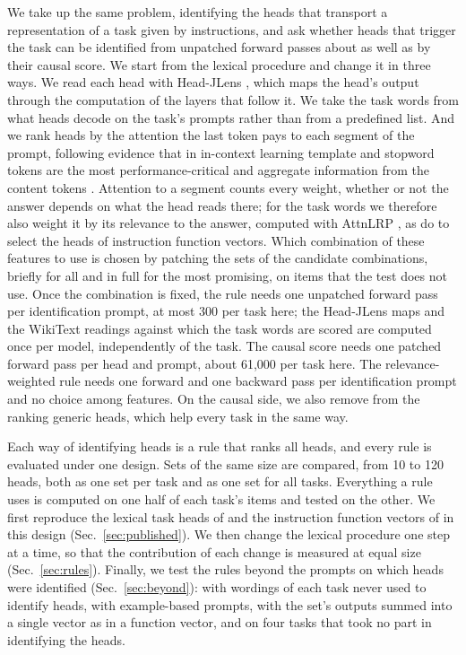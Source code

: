 \documentclass[10pt,a4paper]{article}
\begin{document}
We take up the same problem, identifying the heads that transport a representation of a task given by instructions, and ask whether heads that trigger the task can be identified from unpatched forward passes about as well as by their causal score. We start from the lexical procedure and change it in three ways. We read each head with Head-JLens \citep{merlo2026headjlens}, which maps the head's output through the computation of the layers that follow it. We take the task words from what heads decode on the task's prompts rather than from a predefined list. And we rank heads by the attention the last token pays to each segment of the prompt, following evidence that in in-context learning template and stopword tokens are the most performance-critical and aggregate information from the content tokens \citep{bai2026performance}. Attention to a segment counts every weight, whether or not the answer depends on what the head reads there; for the task words we therefore also weight it by its relevance to the answer, computed with AttnLRP \citep{achtibat2024attnlrp}, as \citet{pham2026fast} do to select the heads of instruction function vectors. Which combination of these features to use is chosen by patching the sets of the candidate combinations, briefly for all and in full for the most promising, on items that the test does not use. Once the combination is fixed, the rule needs one unpatched forward pass per identification prompt, at most 300 per task here; the Head-JLens maps and the WikiText readings against which the task words are scored are computed once per model, independently of the task. The causal score needs one patched forward pass per head and prompt, about 61{,}000 per task here. The relevance-weighted rule needs one forward and one backward pass per identification prompt and no choice among features. On the causal side, we also remove from the ranking generic heads, which help every task in the same way.

Each way of identifying heads is a rule that ranks all heads, and every rule is evaluated under one design. Sets of the same size are compared, from 10 to 120 heads, both as one set per task and as one set for all tasks. Everything a rule uses is computed on one half of each task's items and tested on the other. We first reproduce the lexical task heads of \citet{yang2026shared} and the instruction function vectors of \citet{davidson2025different} in this design (Sec.~\ref{sec:published}). We then change the lexical procedure one step at a time, so that the contribution of each change is measured at equal size (Sec.~\ref{sec:rules}). Finally, we test the rules beyond the prompts on which heads were identified (Sec.~\ref{sec:beyond}): with wordings of each task never used to identify heads, with example-based prompts, with the set's outputs summed into a single vector as in a function vector, and on four tasks that took no part in identifying the heads.
\end{document}
